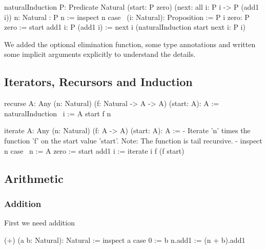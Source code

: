 \begin{alba}
    naturalInduction
        {P: Predicate Natural}
        (start: P zero)
        (next: all {i}: P i -> P (add1 i))
        {n: Natural}
        : P n
    :=
        inspect n case
            {\ (i: Natural): Proposition := P i}
            zero: P zero :=
                start
            add1 i: P (add1 i) :=
                next
                    {i}
                    (naturalInduction start next {i}: P i)
\end{alba}

We added the optional elimination function, some type annotations and written
some implicit arguments explicitly to understand the details.





\subsection{Iterators, Recursors and Induction}

\begin{alba}
    recurse {A: Any} (n: Natural) (f: Natural -> A -> A) (start: A): A :=
        naturalInduction
            {\ i := A}
            start
            f
            {n}

    iterate {A: Any} (n: Natural) (f: A -> A) (start: A): A :=
        {- Iterate 'n' times the function 'f' on the start value 'start'.
           Note: The function is tail recursive. -}
        inspect n case
            {\ n := A}
            zero :=
                start
            add1 i :=
                iterate i f (f start)
\end{alba}










\vskip 5mm
\subsection{Arithmetic}

\subsubsection{Addition}


First we need addition
\begin{alba}
  (+) (a b: Natural): Natural :=
    inspect a case
      0 :=
        b
      n.add1 :=
        (n + b).add1
\end{alba}

